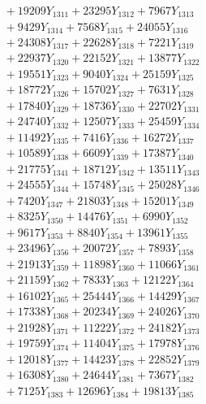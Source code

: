 \documentclass[a4paper,10pt]{article}
\begin{document}
{\begin{align}
&\;  + 19209 Y_{1311} + 23295 Y_{1312} + 7967 Y_{1313} \\[0.3ex]
&\;  + 9429 Y_{1314} + 7568 Y_{1315} + 24055 Y_{1316} \\[0.3ex]
&\;  + 24308 Y_{1317} + 22628 Y_{1318} + 7221 Y_{1319} \\[0.5ex]\allowbreak
&\;  + 22937 Y_{1320} + 22152 Y_{1321} + 13877 Y_{1322} \\[0.3ex]
&\;  + 19551 Y_{1323} + 9040 Y_{1324} + 25159 Y_{1325} \\[0.3ex]
&\;  + 18772 Y_{1326} + 15702 Y_{1327} + 7631 Y_{1328} \\[0.3ex]
&\;  + 17840 Y_{1329} + 18736 Y_{1330} + 22702 Y_{1331} \\[0.3ex]
&\;  + 24740 Y_{1332} + 12507 Y_{1333} + 25459 Y_{1334} \\[0.3ex]
&\;  + 11492 Y_{1335} + 7416 Y_{1336} + 16272 Y_{1337} \\[0.3ex]
&\;  + 10589 Y_{1338} + 6609 Y_{1339} + 17387 Y_{1340} \\[0.3ex]
&\;  + 21775 Y_{1341} + 18712 Y_{1342} + 13511 Y_{1343} \\[0.3ex]
&\;  + 24555 Y_{1344} + 15748 Y_{1345} + 25028 Y_{1346} \\[0.3ex]
&\;  + 7420 Y_{1347} + 21803 Y_{1348} + 15201 Y_{1349} \\[0.5ex]\allowbreak
&\;  + 8325 Y_{1350} + 14476 Y_{1351} + 6990 Y_{1352} \\[0.3ex]
&\;  + 9617 Y_{1353} + 8840 Y_{1354} + 13961 Y_{1355} \\[0.3ex]
&\;  + 23496 Y_{1356} + 20072 Y_{1357} + 7893 Y_{1358} \\[0.3ex]
&\;  + 21913 Y_{1359} + 11898 Y_{1360} + 11066 Y_{1361} \\[0.3ex]
&\;  + 21159 Y_{1362} + 7833 Y_{1363} + 12122 Y_{1364} \\[0.3ex]
&\;  + 16102 Y_{1365} + 25444 Y_{1366} + 14429 Y_{1367} \\[0.3ex]
&\;  + 17338 Y_{1368} + 20234 Y_{1369} + 24026 Y_{1370} \\[0.3ex]
&\;  + 21928 Y_{1371} + 11222 Y_{1372} + 24182 Y_{1373} \\[0.3ex]
&\;  + 19759 Y_{1374} + 11404 Y_{1375} + 17978 Y_{1376} \\[0.3ex]
&\;  + 12018 Y_{1377} + 14423 Y_{1378} + 22852 Y_{1379} \\[0.5ex]\allowbreak
&\;  + 16308 Y_{1380} + 24644 Y_{1381} + 7367 Y_{1382} \\[0.3ex]
&\;  + 7125 Y_{1383} + 12696 Y_{1384} + 19813 Y_{1385} \\[0.3ex]

\end{align}}
\end{document}
